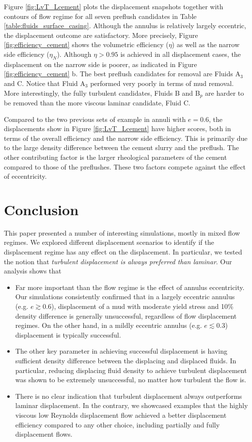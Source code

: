\documentclass[review]{elsarticle}
\begin{document}
Figure \ref{fig:LvT_Lcement} plots the displacement snapshots together with contours of flow regime for all seven preflush candidates in Table \ref{table:fluids_surface_casing}. Although the annulus is relatively largely eccentric, the displacement outcome are satisfactory. More precisely, Figure \ref{fig:efficiency_cement} shows the volumetric efficiency ($\eta$) as well as the narrow side efficiency ($\eta_N$). Although $\eta>0.95$ is achieved in all displacement cases, the displacement on the narrow side is poorer, as indicated in Figure \ref{fig:efficiency_cement} b. The best preflush candidates for removal are Fluids A$_3$ and C. Notice that Fluid A$_3$ performed very poorly in terms of mud removal. More interestingly, the fully turbulent candidates, Fluids B and B$_p$ are harder to be removed than the more viscous laminar candidate, Fluid C. 

Compared to the two previous sets of example in annuli with $e=0.6$, the displacements show in Figure \ref{fig:LvT_Lcement} have higher scores, both in terms of the overall efficiency and the narrow side efficiency. This is primarily due to the large density difference between the cement slurry and the preflush. The other contributing factor is the larger rheological parameters of the cement compared to those of the preflushes. These two factors compete against the effect of eccentricity. 

\section{Conclusion}

This paper presented a number of interesting simulations, mostly in mixed flow regimes. We explored different displacement scenarios to identify if the displacement regime has any effect on the displacement. In particular, we tested the notion that \emph{turbulent displacement is always preferred than laminar}. Our analysis shows that 

\begin{itemize}
	\item Far more important than the flow regime is the effect of annulus eccentricity. Our simulations consistently confirmed that in a largely eccentric annulus (e.g. $e \gtrsim 0.6$), displacement of a mud with moderate yield stress and 10\% density difference is generally unsuccessful, regardless of flow displacement regimes. On the other hand, in a mildly eccentric annulus (e.g. $e \lesssim 0.3$) displacement is typically successful.
	\item The other key parameter in achieving successful displacement is having sufficient density difference between the displacing and displaced fluids. In particular, reducing displacing fluid density to achieve turbulent displacement was shown to be extremely unsuccessful, no matter how turbulent the flow is. 
	\item There is no clear indication that turbulent displacement always outperforms laminar displacement. In the contrary, we showcased examples that the highly viscous low Reynolds displacement flow achieved a better displacement efficiency compared to any other choice, including partially and fully displacement flows.  
\end{itemize}
\end{document}
